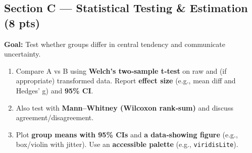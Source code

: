 \documentclass[
  11pt,
]{article}
\providecommand{\tightlist}{%
  \setlength{\itemsep}{0pt}\setlength{\parskip}{0pt}}
\begin{document}
\subsection{Section C --- Statistical Testing \& Estimation (8
pts)}\label{section-c-statistical-testing-estimation-8-pts}

\textbf{Goal:} Test whether groups differ in central tendency and
communicate uncertainty.

\begin{enumerate}
\def\labelenumi{\arabic{enumi}.}
\tightlist
\item
  Compare A vs B using \textbf{Welch's two‑sample t‑test} on raw and (if
  appropriate) transformed data. Report \textbf{effect size} (e.g., mean
  diff and Hedges' g) and \textbf{95\% CI}.
\item
  Also test with \textbf{Mann--Whitney (Wilcoxon rank‑sum)} and discuss
  agreement/disagreement.
\item
  Plot \textbf{group means with 95\% CIs} and \textbf{a data‑showing
  figure} (e.g., box/violin with jitter). Use an \textbf{accessible
  palette} (e.g., \texttt{viridisLite}).
\end{enumerate}
\end{document}

